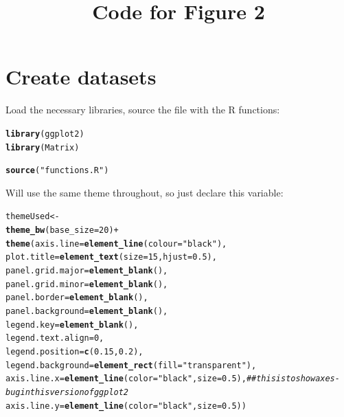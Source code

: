 \documentclass{article}\usepackage[]{graphicx}\usepackage[]{color}
\title{Code for Figure 2}
\makeatletter
\newcommand{\hlnum}[1]{\textcolor[rgb]{0.686,0.059,0.569}{#1}}%
\newcommand{\hlstr}[1]{\textcolor[rgb]{0.192,0.494,0.8}{#1}}%
\newcommand{\hlcom}[1]{\textcolor[rgb]{0.678,0.584,0.686}{\textit{#1}}}%
\newcommand{\hlopt}[1]{\textcolor[rgb]{0,0,0}{#1}}%
\newcommand{\hlstd}[1]{\textcolor[rgb]{0.345,0.345,0.345}{#1}}%
\newcommand{\hlkwb}[1]{\textcolor[rgb]{0.69,0.353,0.396}{#1}}%
\newcommand{\hlkwc}[1]{\textcolor[rgb]{0.333,0.667,0.333}{#1}}%
\newcommand{\hlkwd}[1]{\textcolor[rgb]{0.737,0.353,0.396}{\textbf{#1}}}%
\newenvironment{kframe}{%
 \def\at@end@of@kframe{}%
 \ifinner\ifhmode%
  \def\at@end@of@kframe{\end{minipage}}%
  \begin{minipage}{\columnwidth}%
 \fi\fi%
 \def\FrameCommand##1{\hskip\@totalleftmargin \hskip-\fboxsep
 \colorbox{shadecolor}{##1}\hskip-\fboxsep
     \hskip-\linewidth \hskip-\@totalleftmargin \hskip\columnwidth}%
 \MakeFramed {\advance\hsize-\width
   \@totalleftmargin\z@ \linewidth\hsize
   \@setminipage}}%
 {\par\unskip\endMakeFramed%
 \at@end@of@kframe}
\newenvironment{knitrout}{}{} %
\makeatother
\begin{document}
\maketitle



\section{Create datasets}

Load the necessary libraries, source the file with the R functions:
\begin{knitrout}
\color{fgcolor}\begin{kframe}
\begin{alltt}
\hlkwd{library}\hlstd{(ggplot2)}
\hlkwd{library}\hlstd{(Matrix)}

\hlkwd{source}\hlstd{(}\hlstr{"functions.R"}\hlstd{)}
\end{alltt}
\end{kframe}
\end{knitrout}

Will use the same theme throughout, so just declare this variable:
\begin{knitrout}
\color{fgcolor}\begin{kframe}
\begin{alltt}
\hlstd{themeUsed} \hlkwb{<-}
  \hlkwd{theme_bw}\hlstd{(}\hlkwc{base_size} \hlstd{=} \hlnum{20}\hlstd{)} \hlopt{+}
  \hlkwd{theme}\hlstd{(}\hlkwc{axis.line} \hlstd{=} \hlkwd{element_line}\hlstd{(}\hlkwc{colour} \hlstd{=} \hlstr{"black"}\hlstd{),}
        \hlkwc{plot.title} \hlstd{=} \hlkwd{element_text}\hlstd{(}\hlkwc{size} \hlstd{=} \hlnum{15}\hlstd{,} \hlkwc{hjust}\hlstd{=}\hlnum{0.5}\hlstd{),}
        \hlkwc{panel.grid.major} \hlstd{=} \hlkwd{element_blank}\hlstd{(),}
        \hlkwc{panel.grid.minor} \hlstd{=} \hlkwd{element_blank}\hlstd{(),}
        \hlkwc{panel.border} \hlstd{=} \hlkwd{element_blank}\hlstd{(),}
        \hlkwc{panel.background} \hlstd{=} \hlkwd{element_blank}\hlstd{(),}
        \hlkwc{legend.key} \hlstd{=} \hlkwd{element_blank}\hlstd{(),}
        \hlkwc{legend.text.align} \hlstd{=} \hlnum{0}\hlstd{,}
        \hlkwc{legend.position} \hlstd{=} \hlkwd{c}\hlstd{(}\hlnum{0.15}\hlstd{,}\hlnum{0.2}\hlstd{),}
        \hlkwc{legend.background} \hlstd{=} \hlkwd{element_rect}\hlstd{(}\hlkwc{fill}\hlstd{=}\hlstr{"transparent"}\hlstd{),}
        \hlkwc{axis.line.x} \hlstd{=} \hlkwd{element_line}\hlstd{(}\hlkwc{color}\hlstd{=}\hlstr{"black"}\hlstd{,} \hlkwc{size} \hlstd{=} \hlnum{0.5}\hlstd{),} \hlcom{##this is to show axes - bug in this version of ggplot2}
        \hlkwc{axis.line.y} \hlstd{=} \hlkwd{element_line}\hlstd{(}\hlkwc{color}\hlstd{=}\hlstr{"black"}\hlstd{,} \hlkwc{size} \hlstd{=} \hlnum{0.5}\hlstd{))}
\end{alltt}
\end{kframe}
\end{knitrout}
\end{document}
